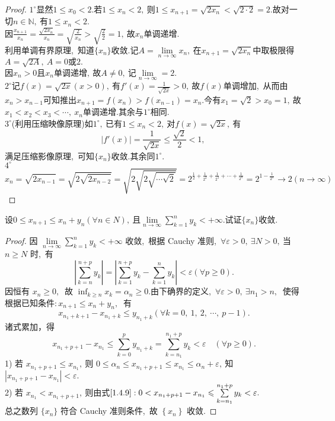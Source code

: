 \begin{proof}
	$1^\circ$显然$1\leqslant x_0<2.$若$1\leqslant x_n<2,\ $则$1\leqslant x_{n+1}=\sqrt{2x_n}<\sqrt{2\cdot 2}=2.$故对一切$n\in\mathbb N,\ $有$1\leqslant x_n<2.$\\
	因$\frac{x_{n+1}}{x_n}=\frac{\sqrt{2x_n}}{x_n}=\sqrt{\frac{2}{x_n}}>\sqrt{\frac{2}{2}}=1,\ $故$x_n$单调递增.\\
	利用单调有界原理,\ 知道$\{x_n\}$收敛.记$A=\lim\limits_{n\rightarrow\infty}x_n,\ $在$x_{n+1}=\sqrt{2x_n}$中取极限得$A=\sqrt{2A},\ A=0\text{或} 2.$\\
	因$x_n>0\text{且} x_n\text{单调递增},\ $故$A\neq 0,\ $记$\lim\limits_{n\rightarrow\infty}=2.$\\
	$2^{\circ}$记$f(x)=\sqrt{2x}(x>0),\ $有$f'(x)=\frac{1}{\sqrt{2x}}>0,\ $故$f(x)$单调增加,\ 从而由$x_n>x_{n-1}$可知推出$x_{n+1}=f(x_n)>f(x_{n-1})=x_n.$今有$x_1=\sqrt{2}>x_0=1,\ $故$x_1<x_2<x_3<\cdots,\ x_n\text{单调递增}.$其余与$1^\circ$相同.\\
	$3^\circ$(利用压缩映像原理)如$1^\circ,\ $已有$1\leqslant x_n<2,\ $对$f(x)=\sqrt{2x},\ $有
	$$\left|f'(x)\right|=\frac{1}{\sqrt{2x}}\leqslant\frac{\sqrt{2}}{2}<1,\ $$
	满足压缩影像原理,\ 可知$\{x_n\}$收敛.其余同$1^\circ.$\\
	$4^\circ$
	$$x_n=\sqrt{2x_{n-1}}=\sqrt{2\sqrt{2x_{n-2}}}=\sqrt{2\sqrt{2\sqrt{\cdots\sqrt{2}}}}=2^{\frac{1}{2}+\frac{1}{2^2}+\frac{1}{2^3}+\cdots+\frac{1}{2^n}}=2^{1-\frac{1}{2^n}}\rightarrow 2(n\rightarrow\infty)$$
\end{proof}
\newpage
\begin{problem}
	设$0\leqslant x_{n+1}\leqslant x_n+y_n(\forall n\in N),\ $且$\lim\limits_{n\rightarrow\infty}\sum\limits_{k=1}^{n}y_k<+\infty.$试证$\{x_n\}$收敛.
\end{problem}
\begin{proof}
	因  $\lim\limits_{n \rightarrow \infty} \sum_{k=1}^{n} y_{k}<+\infty $ 收敛,\  根据 Cauchy 准则,\  $ \forall \varepsilon>0,\  \exists N>0 ,\  $当 $ n \geqslant N $ 时,\  有
	$$\left|\sum_{k=n}^{n+p}y_k\right|=\left|\sum_{k=1}^{n+p}y_k-\sum_{k=1}^{n}y_k\right|<\varepsilon(\forall p\geqslant 0).$$
	因恒有 $ x_{n} \geqslant 0 ,\ $ 故 $ \inf _{k \geqslant n} x_{k}=\alpha_{n} \geqslant 0 . $由下确界的定义,\ $  \forall \varepsilon>0,\  \exists n_{1}>n ,\ $ 使得 根据已知条件$:  x_{n+1} \leqslant x_{n}+y_{n} ,\ $ 有 
	$$x_{n_{1}+k+1}-x_{n_{1}+k} \leqslant y_{n_{1}+k}(\forall k=0,\ 1,\ 2,\  \cdots,\  p-1) .$$
	诸式累加，得
	\begin{equation}
		x_{n_{1}+p+1}-x_{n_{1}} \leqslant \sum_{k=0}^{p} y_{n_{1}+k}=\sum_{k=n_{1}}^{n_{1}+p} y_{k}<\varepsilon\quad(\forall p \geqslant 0) .\label{1.4.9}
	\end{equation}
	1) 若 $ x_{n_{1}+p+1} \leqslant x_{n_{1}} ,\  $则  $0 \leqslant \alpha_{n} \leqslant x_{n_{1}+p+1} \leqslant x_{n_{1}} \leqslant \alpha_{n}+\varepsilon ,\  $知  $\left|x_{n_{1}+p+1}-x_{n_{1}}\right|<\varepsilon .$\\
	2) 若  $x_{n_{1}}<x_{n_{1}+p+1} ,\  $则由式$\eqref{1.4.9}:0<  x_{n_{1}+p+1}-x_{n_{1}} \leqslant \sum\limits_{k=n_{1}}^{n_{1}+p} y_{k}<\varepsilon . $\\
	总之数列  $\{x_n\}$  符合 Cauchy 准则条件,\  故  $\left\{x_{n}\right\} $ 收敛.
\end{proof}
